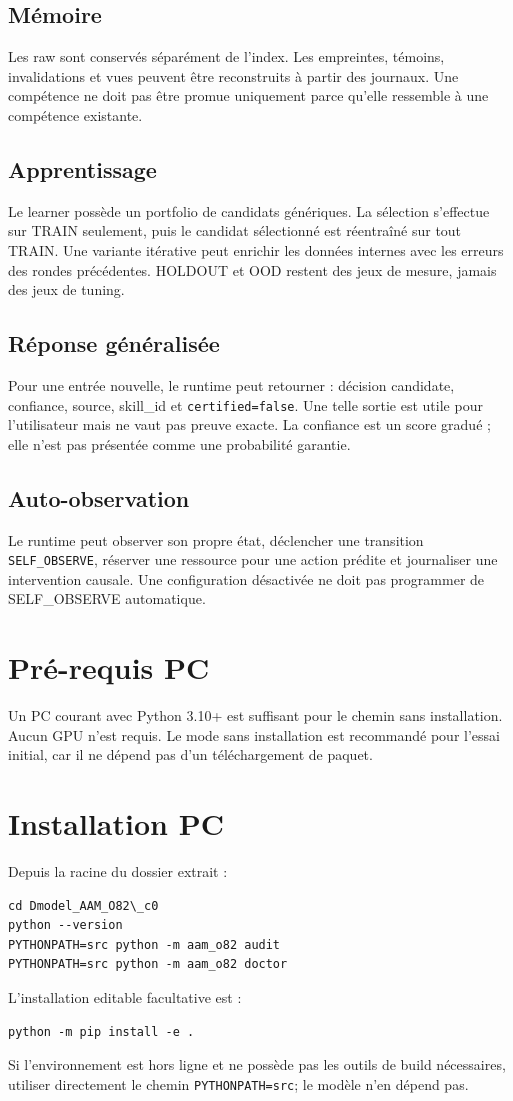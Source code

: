 \documentclass[11pt,a4paper]{report}
\begin{document}
\section{Mémoire}
Les raw sont conservés séparément de l'index. Les empreintes, témoins, invalidations et vues peuvent être reconstruits à partir des journaux. Une compétence ne doit pas être promue uniquement parce qu'elle ressemble à une compétence existante.

\section{Apprentissage}
Le learner possède un portfolio de candidats génériques. La sélection s'effectue sur TRAIN seulement, puis le candidat sélectionné est réentraîné sur tout TRAIN. Une variante itérative peut enrichir les données internes avec les erreurs des rondes précédentes. HOLDOUT et OOD restent des jeux de mesure, jamais des jeux de tuning.

\section{Réponse généralisée}
Pour une entrée nouvelle, le runtime peut retourner : décision candidate, confiance, source, skill\_id et \texttt{certified=false}. Une telle sortie est utile pour l'utilisateur mais ne vaut pas preuve exacte. La confiance est un score gradué ; elle n'est pas présentée comme une probabilité garantie.

\section{Auto-observation}
Le runtime peut observer son propre état, déclencher une transition \texttt{SELF\_OBSERVE}, réserver une ressource pour une action prédite et journaliser une intervention causale. Une configuration désactivée ne doit pas programmer de SELF\_OBSERVE automatique.

\chapter{Pré-requis PC}
Un PC courant avec Python 3.10+ est suffisant pour le chemin sans installation. Aucun GPU n'est requis. Le mode sans installation est recommandé pour l'essai initial, car il ne dépend pas d'un téléchargement de paquet.

\chapter{Installation PC}
Depuis la racine du dossier extrait :
\begin{verbatim}
cd Dmodel_AAM_O82\_c0
python --version
PYTHONPATH=src python -m aam_o82 audit
PYTHONPATH=src python -m aam_o82 doctor
\end{verbatim}
L'installation editable facultative est :
\begin{verbatim}
python -m pip install -e .
\end{verbatim}
Si l'environnement est hors ligne et ne possède pas les outils de build nécessaires, utiliser directement le chemin \texttt{PYTHONPATH=src}; le modèle n'en dépend pas.
\end{document}
